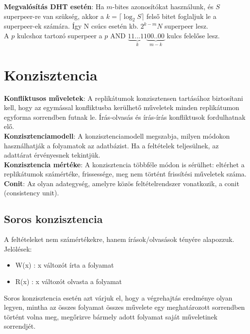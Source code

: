 \documentclass[12pt]{article}
\begin{document}
	\noindent \textbf{Megvalósítás DHT esetén}: Ha $m$-bites azonosítókat használunk, és $S$ superpeer-re van szükség, akkor
	a $k= \lceil \log_{2} S \rceil$ felső bitet foglaljuk le a superpeer-ek számára. Így N csúcs esetén kb. $2^{k-m}N$
	superpeer lesz.\\
	
	\noindent A $p$ kulcshoz tartozó superpeer a $p$ AND $\underbrace{11...11}_{k}\underbrace{00..00}_{m-k}$ kulcs felelőse lesz.
	
	\section{Konzisztencia}
	
	\noindent \textbf{Konfliktusos műveletek}: A replikátumok konzisztensen tartásához biztosítani kell, hogy az egymással
	konfliktusba kerülhető műveletek minden replikátumon egyforma sorrendben futnak le. Írás-olvasás és írás-írás
	konfliktusok fordulhatnak elő.\\
	
	\noindent \textbf{Konzisztenciamodell}: A konzisztenciamodell megszabja, milyen módokon használhatják a folyamatok
	az adatbázist. Ha a feltételek teljesülnek, az adattárat érvényesnek tekintjük.\\
	
	\noindent \textbf{Konzisztencia mértéke}: A konzisztencia többféle módon is sérülhet: eltérhet a replikátumok
	számértéke, frissessége, meg nem történt frissítési műveletek száma.\\
	
	\noindent \textbf{Conit}: Az olyan adategység, amelyre közös feltételrendszer vonatkozik, a conit (consistency unit).
	
	\subsection{Soros konzisztencia}
	
	A feltételeket nem számértékekre, hanem írások/olvasások tényére alapozzuk.
	Jelölések:
	\begin{itemize}
		\item	W(x) : x változót írta a folyamat
		\item	R(x) : x változót olvasta a folyamat
	\end{itemize}
	
	\noindent Soros konzisztencia esetén azt várjuk el, hogy a végrehajtás eredménye olyan legyen, mintha az összes folyamat
	összes művelete egy meghatározott sorrendben történt volna meg, megőrizve bármely adott folyamat saját műveletinek
	sorrendjét.
\end{document}
